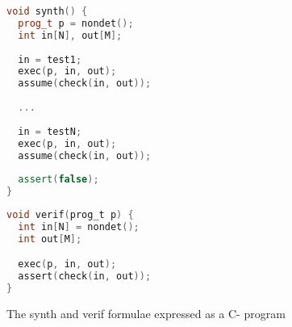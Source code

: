 \documentclass[a4paper]{llncs}
\begin{document}
\begin{figure}
\centering
\begin{minipage}{0.45\textwidth}
\begin{lstlisting}[language=C++]
void synth() {
  prog_t p = nondet();
  int in[N], out[M];
  
  in = test1;
  exec(p, in, out);
  assume(check(in, out));
  
  ...
  
  in = testN;
  exec(p, in, out);
  assume(check(in, out));
  
  assert(false);
}
\end{lstlisting}
\end{minipage}
\begin{minipage}{0.45\textwidth}
\begin{lstlisting}[language=C]
void verif(prog_t p) {
  int in[N] = nondet();
  int out[M];

  exec(p, in, out);
  assert(check(in, out));
}
\end{lstlisting}
\end{minipage}

 \label{fig:c-synthverif}
 \caption{The {\sc synth} and {\sc verif} formulae expressed as a C- program}
\end{figure}
\end{document}
